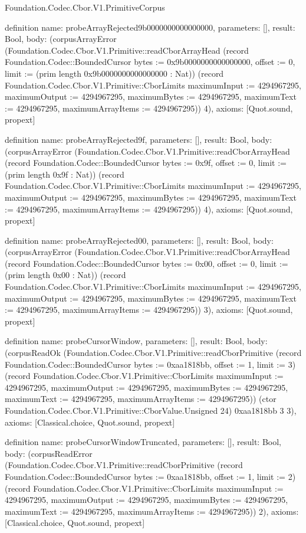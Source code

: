\begin{lexlean}{Foundation.Codec.Cbor.V1.PrimitiveCorpus}
\begin{semanticmodule}
definition{
  name: probeArrayRejected9b0000000000000000,
  parameters: [],
  result: Bool,
  body: (corpusArrayError (Foundation.Codec.Cbor.V1.Primitive::readCborArrayHead (record Foundation.Codec::BoundedCursor {bytes := 0x9b0000000000000000, offset := 0, limit := (prim length 0x9b0000000000000000 : Nat)}) (record Foundation.Codec.Cbor.V1.Primitive::CborLimits {maximumInput := 4294967295, maximumOutput := 4294967295, maximumBytes := 4294967295, maximumText := 4294967295, maximumArrayItems := 4294967295})) 4),
  axioms: [Quot.sound, propext]
}

definition{
  name: probeArrayRejected9f,
  parameters: [],
  result: Bool,
  body: (corpusArrayError (Foundation.Codec.Cbor.V1.Primitive::readCborArrayHead (record Foundation.Codec::BoundedCursor {bytes := 0x9f, offset := 0, limit := (prim length 0x9f : Nat)}) (record Foundation.Codec.Cbor.V1.Primitive::CborLimits {maximumInput := 4294967295, maximumOutput := 4294967295, maximumBytes := 4294967295, maximumText := 4294967295, maximumArrayItems := 4294967295})) 4),
  axioms: [Quot.sound, propext]
}

definition{
  name: probeArrayRejected00,
  parameters: [],
  result: Bool,
  body: (corpusArrayError (Foundation.Codec.Cbor.V1.Primitive::readCborArrayHead (record Foundation.Codec::BoundedCursor {bytes := 0x00, offset := 0, limit := (prim length 0x00 : Nat)}) (record Foundation.Codec.Cbor.V1.Primitive::CborLimits {maximumInput := 4294967295, maximumOutput := 4294967295, maximumBytes := 4294967295, maximumText := 4294967295, maximumArrayItems := 4294967295})) 3),
  axioms: [Quot.sound, propext]
}

definition{
  name: probeCursorWindow,
  parameters: [],
  result: Bool,
  body: (corpusReadOk (Foundation.Codec.Cbor.V1.Primitive::readCborPrimitive (record Foundation.Codec::BoundedCursor {bytes := 0xaa1818bb, offset := 1, limit := 3}) (record Foundation.Codec.Cbor.V1.Primitive::CborLimits {maximumInput := 4294967295, maximumOutput := 4294967295, maximumBytes := 4294967295, maximumText := 4294967295, maximumArrayItems := 4294967295})) (ctor Foundation.Codec.Cbor.V1.Primitive::CborValue.Unsigned 24) 0xaa1818bb 3 3),
  axioms: [Classical.choice, Quot.sound, propext]
}

definition{
  name: probeCursorWindowTruncated,
  parameters: [],
  result: Bool,
  body: (corpusReadError (Foundation.Codec.Cbor.V1.Primitive::readCborPrimitive (record Foundation.Codec::BoundedCursor {bytes := 0xaa1818bb, offset := 1, limit := 2}) (record Foundation.Codec.Cbor.V1.Primitive::CborLimits {maximumInput := 4294967295, maximumOutput := 4294967295, maximumBytes := 4294967295, maximumText := 4294967295, maximumArrayItems := 4294967295})) 2),
  axioms: [Classical.choice, Quot.sound, propext]
}


\end{semanticmodule}
\end{lexlean}

